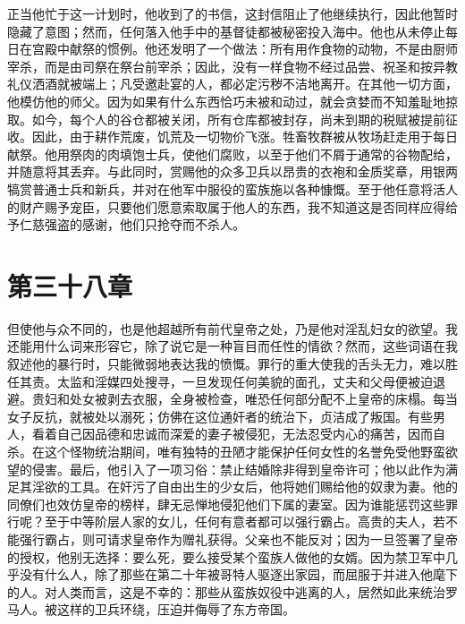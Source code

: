 正当他忙于这一计划时，他收到了的书信，这封信阻止了他继续执行，因此他暂时隐藏了意图；然而，任何落入他手中的基督徒都被秘密投入海中。他也从未停止每日在宫殿中献祭的惯例。他还发明了一个做法：所有用作食物的动物，不是由厨师宰杀，而是由司祭在祭台前宰杀；因此，没有一样食物不经过品尝、祝圣和按异教礼仪洒酒就被端上；凡受邀赴宴的人，都必定污秽不洁地离开。在其他一切方面，他模仿他的师父。因为如果有什么东西恰巧未被和动过，就会贪婪而不知羞耻地掠取。如今，每个人的谷仓都被关闭，所有仓库都被封存，尚未到期的税赋被提前征收。因此，由于耕作荒废，饥荒及一切物价飞涨。牲畜牧群被从牧场赶走用于每日献祭。他用祭肉的肉填饱士兵，使他们腐败，以至于他们不屑于通常的谷物配给，并随意将其丢弃。与此同时，赏赐他的众多卫兵以昂贵的衣袍和金质奖章，用银两犒赏普通士兵和新兵，并对在他军中服役的蛮族施以各种慷慨。至于他任意将活人的财产赐予宠臣，只要他们愿意索取属于他人的东西，我不知道这是否同样应得给予仁慈强盗的感谢，他们只抢夺而不杀人。\par


\section{第三十八章}

但使他与众不同的，也是他超越所有前代皇帝之处，乃是他对淫乱妇女的欲望。我还能用什么词来形容它，除了说它是一种盲目而任性的情欲？然而，这些词语在我叙述他的暴行时，只能微弱地表达我的愤慨。罪行的重大使我的舌头无力，难以胜任其责。太监和淫媒四处搜寻，一旦发现任何美貌的面孔，丈夫和父母便被迫退避。贵妇和处女被剥去衣服，全身被检查，唯恐任何部分配不上皇帝的床榻。每当女子反抗，就被处以溺死；仿佛在这位通奸者的统治下，贞洁成了叛国。有些男人，看着自己因品德和忠诚而深爱的妻子被侵犯，无法忍受内心的痛苦，因而自杀。在这个怪物统治期间，唯有独特的丑陋才能保护任何女性的名誉免受他野蛮欲望的侵害。最后，他引入了一项习俗：禁止结婚除非得到皇帝许可；他以此作为满足其淫欲的工具。在奸污了自由出生的少女后，他将她们赐给他的奴隶为妻。他的同僚们也效仿皇帝的榜样，肆无忌惮地侵犯他们下属的妻室。因为谁能惩罚这些罪行呢？至于中等阶层人家的女儿，任何有意者都可以强行霸占。高贵的夫人，若不能强行霸占，则可请求皇帝作为赠礼获得。父亲也不能反对；因为一旦签署了皇帝的授权，他别无选择：要么死，要么接受某个蛮族人做他的女婿。因为禁卫军中几乎没有什么人，除了那些在第二十年被哥特人驱逐出家园，而屈服于并进入他麾下的人。对人类而言，这是不幸的：那些从蛮族奴役中逃离的人，居然如此来统治罗马人。被这样的卫兵环绕，压迫并侮辱了东方帝国。\par

